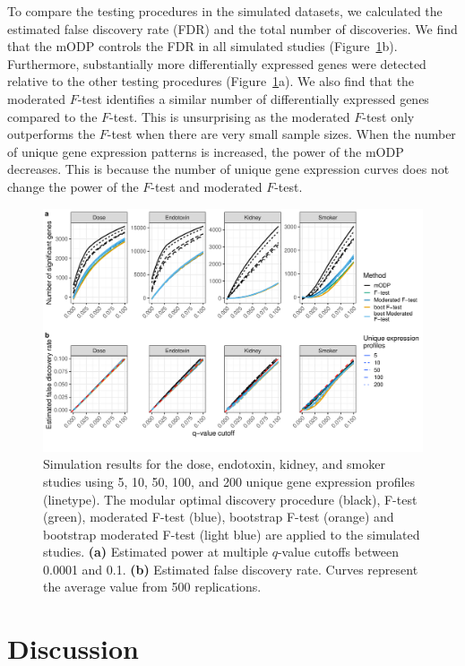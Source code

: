 \documentclass[11pt]{article}
\begin{document}
To compare the testing procedures in the simulated datasets, we calculated the estimated false discovery rate (FDR) and the total number of discoveries. We find that the mODP controls the FDR in all simulated studies (Figure~\ref{fig:simulationResults}b). Furthermore, substantially more differentially expressed genes were detected relative to the other testing procedures (Figure~\ref{fig:simulationResults}a). We also find that the moderated $F$-test identifies a similar number of differentially expressed genes compared to the $F$-test. This is unsurprising as the moderated $F$-test only outperforms the $F$-test when there are very small sample sizes. When the number of unique gene expression patterns is increased, the power of the mODP decreases. This is because the number of unique gene expression curves does not change the power of the $F$-test and moderated $F$-test.

\begin{figure}[!t]
\centering
\includegraphics[scale = 0.5]{../analysis/figures/simulation_study.pdf}  
\caption{Simulation results for the dose, endotoxin, kidney, and smoker studies using 5, 10, 50, 100, and 200 unique gene expression profiles (linetype). The modular optimal discovery procedure (black), F-test (green), moderated F-test (blue), bootstrap F-test (orange) and bootstrap moderated F-test (light blue) are applied to the simulated studies. \textbf{(a)} Estimated power at multiple $q$-value cutoffs between 0.0001 and 0.1. \textbf{(b)} Estimated false discovery rate. Curves represent the average value from 500 replications.}
\label{fig:simulationResults}
\end{figure}

\section{Discussion\label{Sec:discussion}}
\end{document}
